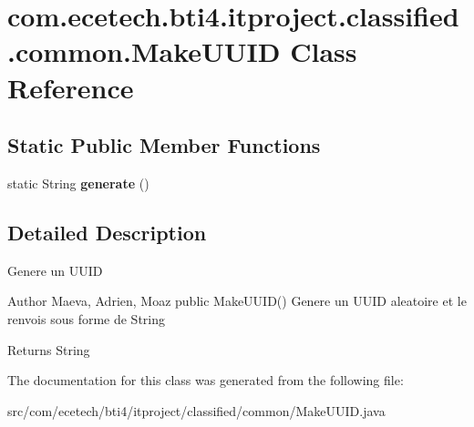\hypertarget{classcom_1_1ecetech_1_1bti4_1_1itproject_1_1classified_1_1common_1_1_make_u_u_i_d}{}\section{com.\+ecetech.\+bti4.\+itproject.\+classified.\+common.\+Make\+U\+U\+ID Class Reference}
\label{classcom_1_1ecetech_1_1bti4_1_1itproject_1_1classified_1_1common_1_1_make_u_u_i_d}
\subsection*{Static Public Member Functions}
\begin{DoxyCompactItemize}
\item 
static String {\bfseries generate} ()\hypertarget{classcom_1_1ecetech_1_1bti4_1_1itproject_1_1classified_1_1common_1_1_make_u_u_i_d_ad390b131e6bf66c1a564dd814957af53}{}\label{classcom_1_1ecetech_1_1bti4_1_1itproject_1_1classified_1_1common_1_1_make_u_u_i_d_ad390b131e6bf66c1a564dd814957af53}

\end{DoxyCompactItemize}


\subsection{Detailed Description}
Genere un U\+U\+ID \begin{DoxyAuthor}{Author}
Maeva, Adrien, Moaz public Make\+U\+U\+I\+D() Genere un U\+U\+ID aleatoire et le renvois sous forme de String 
\end{DoxyAuthor}
\begin{DoxyReturn}{Returns}
String 
\end{DoxyReturn}


The documentation for this class was generated from the following file\+:\begin{DoxyCompactItemize}
\item 
src/com/ecetech/bti4/itproject/classified/common/Make\+U\+U\+I\+D.\+java\end{DoxyCompactItemize}
